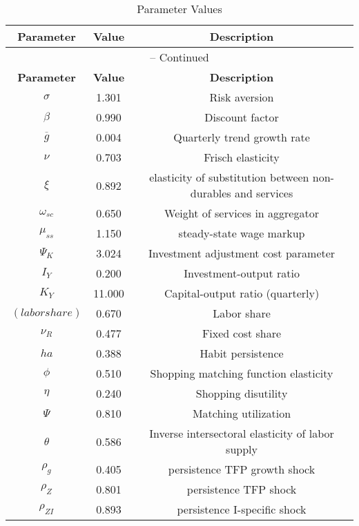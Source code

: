 \begin{center}
\begin{longtable}{ccc}
\caption{Parameter Values}\\%
\toprule%
\multicolumn{1}{c}{\textbf{Parameter}} &
\multicolumn{1}{c}{\textbf{Value}} &
 \multicolumn{1}{c}{\textbf{Description}}\\%
\midrule%
\endfirsthead
\multicolumn{3}{c}{{\tablename} \thetable{} -- Continued}\\%
\midrule%
\multicolumn{1}{c}{\textbf{Parameter}} &
\multicolumn{1}{c}{\textbf{Value}} &
  \multicolumn{1}{c}{\textbf{Description}}\\%
\midrule%
\endhead
${\sigma}$ 	 & 	 1.301 	 & 	 Risk aversion\\
${\beta}$ 	 & 	 0.990 	 & 	 Discount factor\\
${\overline{g}}$ 	 & 	 0.004 	 & 	 Quarterly trend growth rate\\
$\nu$ 	 & 	 0.703 	 & 	 Frisch elasticity\\
$\xi$ 	 & 	 0.892 	 & 	 elasticity of substitution between non-durables and services\\
$\omega_{sc}$ 	 & 	 0.650 	 & 	 Weight of services in aggregator\\
$\mu_{ss}$ 	 & 	 1.150 	 & 	 steady-state wage markup\\
${\Psi_{K}}$ 	 & 	 3.024 	 & 	 Investment adjustment cost parameter\\
${I_Y}$ 	 & 	 0.200 	 & 	 Investment-output ratio\\
${K_Y}$ 	 & 	 11.000 	 & 	 Capital-output ratio (quarterly)\\
$(labor share)$ 	 & 	 0.670 	 & 	 Labor share\\
${\nu_R}$ 	 & 	 0.477 	 & 	 Fixed cost share\\
${ha}$ 	 & 	 0.388 	 & 	 Habit persistence\\
${\phi}$ 	 & 	 0.510 	 & 	 Shopping matching function elasticity\\
${\eta}$ 	 & 	 0.240 	 & 	 Shopping disutility\\
${\Psi}$ 	 & 	 0.810 	 & 	 Matching utilization\\
${\theta}$ 	 & 	 0.586 	 & 	 Inverse intersectoral elasticity of labor supply\\
${\rho_g}$ 	 & 	 0.405 	 & 	 persistence TFP growth shock\\
${\rho_Z}$ 	 & 	 0.801 	 & 	 persistence TFP shock\\
${\rho_{ZI}}$ 	 & 	 0.893 	 & 	 persistence I-specific shock\\

\end{longtable}
\end{center}
